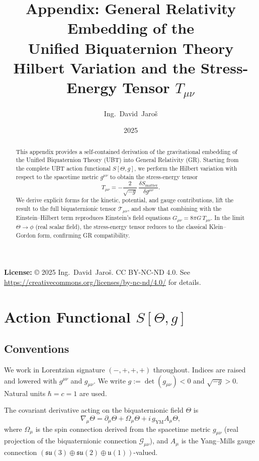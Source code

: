 \documentclass[12pt]{article}
\title{Appendix: General Relativity Embedding of the\\
       Unified Biquaternion Theory\\[0.3em]
       \large Hilbert Variation and the Stress-Energy Tensor $T_{\mu\nu}$}
\author{Ing.~David~Jaroš}
\date{2025}
\newcommand{\calT}{\mathcal{T}}
\begin{document}
\maketitle

\noindent\textbf{License:} © 2025 Ing.~David~Jaroš. CC BY-NC-ND 4.0.
See \url{https://creativecommons.org/licenses/by-nc-nd/4.0/} for details.

\vspace{1em}

\begin{abstract}
This appendix provides a self-contained derivation of the gravitational
embedding of the Unified Biquaternion Theory (UBT) into General Relativity (GR).
Starting from the complete UBT action functional $S[\Theta, g]$, we perform
the Hilbert variation with respect to the spacetime metric $g^{\mu\nu}$ to
obtain the stress-energy tensor
\[
  T_{\mu\nu} = -\frac{2}{\sqrt{-g}}\,\frac{\delta S_{\mathrm{matter}}}{\delta g^{\mu\nu}}.
\]
We derive explicit forms for the kinetic, potential, and gauge contributions,
lift the result to the full biquaternionic tensor $\calT_{\mu\nu}$, and show
that combining with the Einstein--Hilbert term reproduces Einstein's field
equations $G_{\mu\nu} = 8\pi G\,T_{\mu\nu}$.  In the limit $\Theta \to \phi$
(real scalar field), the stress-energy tensor reduces to the classical
Klein--Gordon form, confirming GR compatibility.
\end{abstract}

\tableofcontents

\newpage

\section{Action Functional $S[\Theta, g]$}
\label{sec:action}

\subsection{Conventions}

We work in Lorentzian signature $(-,+,+,+)$ throughout.
Indices are raised and lowered with $g^{\mu\nu}$ and $g_{\mu\nu}$.
We write $g := \det(g_{\mu\nu}) < 0$ and $\sqrt{-g} > 0$.
Natural units $\hbar = c = 1$ are used.

The covariant derivative acting on the biquaternionic field $\Theta$ is
\begin{equation}
  \nabla_\mu \Theta = \partial_\mu \Theta + \Omega_\mu \Theta
                      + i\,g_{\mathrm{YM}} A_\mu \Theta,
  \label{eq:cov_deriv}
\end{equation}
where $\Omega_\mu$ is the spin connection derived from the spacetime metric
$g_{\mu\nu}$ (real projection of the biquaternionic connection $\mathcal{G}_{\mu\nu}$),
and $A_\mu$ is the Yang--Mills gauge connection
$(\mathfrak{su}(3)\oplus\mathfrak{su}(2)\oplus\mathfrak{u}(1))$-valued.
\end{document}
